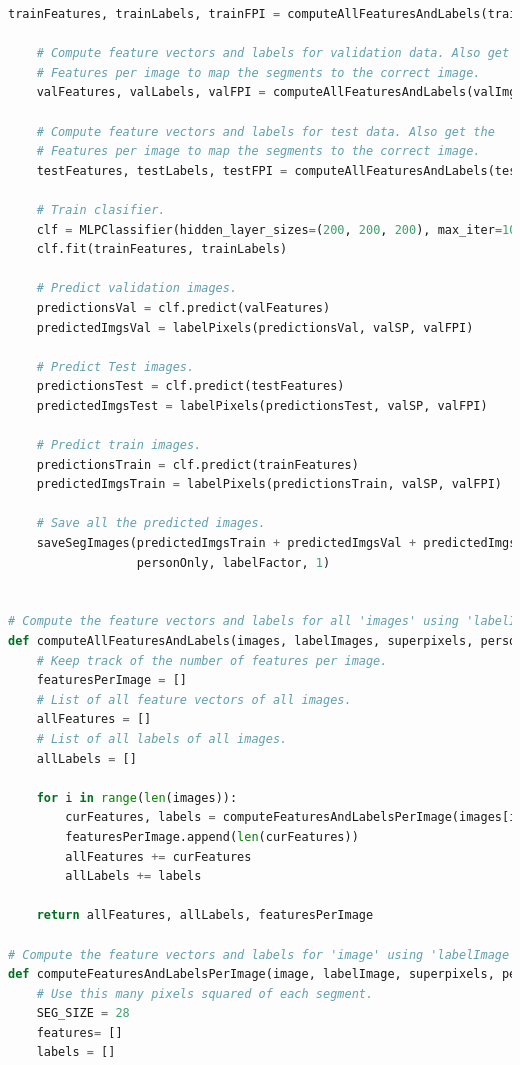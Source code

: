 \documentclass{csc_assignment5}
\begin{document}
\begin{description}
\begin{lstlisting}[language=Python]
    trainFeatures, trainLabels, trainFPI = computeAllFeaturesAndLabels(trainImgs, trainLabels, trainSP, personOnly)
    
    # Compute feature vectors and labels for validation data. Also get the
    # Features per image to map the segments to the correct image.
    valFeatures, valLabels, valFPI = computeAllFeaturesAndLabels(valImgs, valLabels, valSP, personOnly)
    
    # Compute feature vectors and labels for test data. Also get the
    # Features per image to map the segments to the correct image.
    testFeatures, testLabels, testFPI = computeAllFeaturesAndLabels(testImgs, testLabels, testSP, personOnly)
    
    # Train clasifier.
    clf = MLPClassifier(hidden_layer_sizes=(200, 200, 200), max_iter=10000)
    clf.fit(trainFeatures, trainLabels)
    
    # Predict validation images.
    predictionsVal = clf.predict(valFeatures)
    predictedImgsVal = labelPixels(predictionsVal, valSP, valFPI)
    
    # Predict Test images.
    predictionsTest = clf.predict(testFeatures)
    predictedImgsTest = labelPixels(predictionsTest, valSP, valFPI)
    
    # Predict train images.
    predictionsTrain = clf.predict(trainFeatures)
    predictedImgsTrain = labelPixels(predictionsTrain, valSP, valFPI)
    
    # Save all the predicted images.
    saveSegImages(predictedImgsTrain + predictedImgsVal + predictedImgsTest,
                  personOnly, labelFactor, 1)
    
    
# Compute the feature vectors and labels for all 'images' using 'labelImages' and 'superpixels'.
def computeAllFeaturesAndLabels(images, labelImages, superpixels, personOnly):
    # Keep track of the number of features per image.
    featuresPerImage = []
    # List of all feature vectors of all images.
    allFeatures = []
    # List of all labels of all images.
    allLabels = []
    
    for i in range(len(images)):
        curFeatures, labels = computeFeaturesAndLabelsPerImage(images[i], labelImages[i], superpixels[i], personOnly)
        featuresPerImage.append(len(curFeatures))
        allFeatures += curFeatures
        allLabels += labels
    
    return allFeatures, allLabels, featuresPerImage

# Compute the feature vectors and labels for 'image' using 'labelImage' and 'superpixels'.
def computeFeaturesAndLabelsPerImage(image, labelImage, superpixels, personOnly):
    # Use this many pixels squared of each segment.
    SEG_SIZE = 28
    features= []
    labels = []
    

\end{lstlisting}
\end{description}
\end{document}
